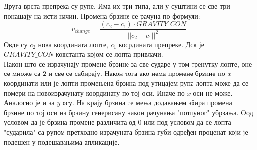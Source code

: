 Друга врста препрека су рупе.
Има их три типа, али у суштини се све три понашају на исти начин. 
Промена брзине се рачуна по формули:
$$v_{change} =  \frac{(c_2 - c_1) \cdot GRAVITY\_CON}{|| c_2-c_1||^2}$$
Овде су $c_2$ нова координата лопте, $c_1$ координата препреке. Док је $GRAVITY\_CON$ константа којом се лопта привлачи.
\\ \indent
Након што се израчунају промене брзине за све сударе у том тренутку лопте, оне се множе са 2 и све се сабирају. Након тога ако нема промене брзине по $x$ координати или је лопти промењена брзина под утицајем рупа лопта може да се помери на новоизрачунату координату по тој оси. Иначе по $x$ оси не може. Аналогно је и за $y$ осу. На крају брзина се мења додавањем збира промена брзине по тој оси на брзину генерисану након рачунања "потпуног" убрзања. Oод условом да је брзина промене различита од 0 или под условом да се лопта "сударила" са рупом претходно израчуната брзина губи одређен проценат који је подешен у подешавањима апликације.



